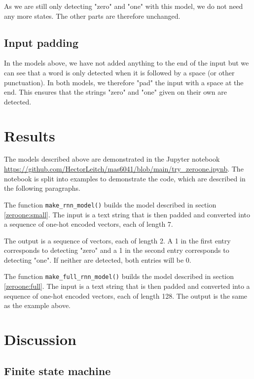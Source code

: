 \documentclass{somasmsc}
\begin{document}
As we are still only detecting "zero" and "one" with this model, we do not need any more states. The other parts are therefore unchanged.

\subsection{Input padding}

In the models above, we have not added anything to the end of the input but we can see that a word is only detected when it is followed by a space (or other punctuation). In both models, we therefore "pad" the input with a space at the end. This ensures that the strings "zero" and "one" given on their own are detected.


\section{Results}

The models described above are demonstrated in the Jupyter notebook \url{https://github.com/HectorLeitch/mas6041/blob/main/try_zeroone.ipynb}. The notebook is split into examples to demonstrate the code, which are described in the following paragraphs.

\begin{exa}
The function \verb|make_rnn_model()| builds the model described in section \ref{zeroone:small}. The input is a text string that is then padded and converted into a sequence of one-hot encoded vectors, each of length 7.

The output is a sequence of vectors, each of length 2. A 1 in the first entry corresponds to detecting "zero" and a 1 in the second entry corresponds to detecting "one". If neither are detected, both entries will be 0.
\end{exa}

\begin{exa}
The function \verb|make_full_rnn_model()| builds the model described in section \ref{zeroone:full}. The input is a text string that is then padded and converted into a sequence of one-hot encoded vectors, each of length 128. The output is the same as the example above.
\end{exa}

\section{Discussion}

\subsection{Finite state machine}
\end{document}
